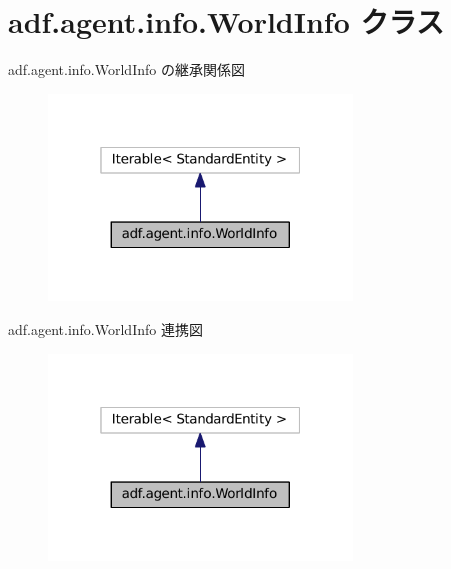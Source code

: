 \hypertarget{classadf_1_1agent_1_1info_1_1WorldInfo}{}\section{adf.\+agent.\+info.\+World\+Info クラス}
\label{classadf_1_1agent_1_1info_1_1WorldInfo}


adf.\+agent.\+info.\+World\+Info の継承関係図
\nopagebreak
\begin{figure}[H]
\begin{center}
\leavevmode
\includegraphics[width=229pt]{classadf_1_1agent_1_1info_1_1WorldInfo__inherit__graph}
\end{center}
\end{figure}


adf.\+agent.\+info.\+World\+Info 連携図
\nopagebreak
\begin{figure}[H]
\begin{center}
\leavevmode
\includegraphics[width=229pt]{classadf_1_1agent_1_1info_1_1WorldInfo__coll__graph}
\end{center}
\end{figure}
